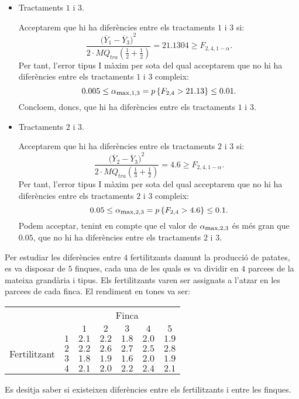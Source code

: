 {\begin{itemize}
	Fent c\`alculs, acceptarem que hi ha difer\`encies entre els tractaments 
	$1$ i $2$ si:
	\[
	\frac{{({\overline{Y}_1 
-\overline{Y}_2)}^2}}{2\cdot 
MQ_{tra}\left(\frac{1}{2}+\frac{1}{3}\right)}
=8.3565\geq  F_{2,4,1-\alpha}.
	\]
	Per tant, l'error tipus I m\`axim per sota del qual acceptarem que no hi 
	ha difer\`encies entre els tractaments $1$ i $2$ compleix:
	\[
	0.01\leq \alpha_{\mbox{\footnotesize max},1,2}=\pp{F_{2,4}> 8.35}\leq 
	0.05.
	\]
	Concloem, doncs, que hi ha difer\`encies entre els tractaments $1$ i $2$.
	\item  Tractaments $1$ i $3$.
	
	Acceptarem que hi ha difer\`encies entre els tractaments 
	$1$ i $3$ si:
		\[
	\frac{{({\overline{Y}_1 
-\overline{Y}_3)}^2}}{2\cdot 
MQ_{tra}\left(\frac{1}{2}+\frac{1}{2}\right)}
=21.1304\geq  F_{2,4,1-\alpha}.
	\]
	Per tant, l'error tipus I m\`axim per sota del qual acceptarem que no hi 
	ha difer\`encies entre els tractaments $1$ i $3$ compleix:
	\[
	0.005\leq \alpha_{\mbox{\footnotesize max},1,3}=p\left\{F_{2,4}>21.13\right\}\leq 
	0.01.
	\]
	Concloem, doncs, que hi ha difer\`encies entre els tractaments $1$ i $3$.
	\item   Tractaments $2$ i $3$.
	
	Acceptarem que hi ha difer\`encies entre els tractaments 
	$2$ i $3$ si:
		\[
	\frac{{({\overline{Y}_2 
-\overline{Y}_3)}^2}}{2\cdot 
MQ_{tra}\left(\frac{1}{3}+\frac{1}{2}\right)}
=4.6\geq  F_{2,4,1-\alpha}.
	\]
	Per tant, l'error tipus I m\`axim per sota del qual acceptarem que no hi 
	ha difer\`encies entre els tractaments $2$ i $3$ compleix:
	\[
	0.05\leq \alpha_{\mbox{\footnotesize max},2,3}=p\left\{F_{2,4}>4.6\right\}\leq 
	0.1.
	\]
	Podem acceptar, tenint en compte que el valor de 
	$\alpha_{\mbox{\footnotesize max},2,3}$ \'es m\'es gran que $0.05$, que no hi ha difer\`encies 
	entre els tractaments $2$ i $3$.
\end{itemize}
}

\begin{probres}
{Per estudiar les difer\`encies entre $4$
fertilitzants damunt la producci\'o de patates, es va
disposar de $5$ finques, cada una de les quals es va
dividir en $4$ parce{\lgem}es de la mateixa grand\`aria i tipus. Els
fertilitzants varen ser assignats a l'atzar en les
parce{\lgem}es de cada finca. El rendiment en tones va
ser:
\begin{center}
\begin{tabular}{c|c||c|c|c|c|c|}
\multicolumn{2}{c|}{}&\multicolumn{5}{c|}{Finca}\\\cline{3-7}
\multicolumn{2}{c|}{}&$1$&$2$&$3$&$4$&$5$\\\hline\hline
\multirow{4}{2.5cm}{Fertilitzant}&$1$&$2.1$&$2.2$&$1.8$&$2.0$&$1.9$\\\cline{2-7}
&$2$&$2.2$&$2.6$&$2.7$&$2.5$&$2.8$\\\cline{2-7}
&$3$&$1.8$&$1.9$&$1.6$&$2.0$&$1.9$\\\cline{2-7}
&$4$&$2.1$&$2.0$&$2.2$&$2.4$&$2.1$\\\hline
\end{tabular}
\end{center}
Es desitja saber si existeixen difer\`encies entre els
fertilitzants i entre les finques.}
\end{probres}


